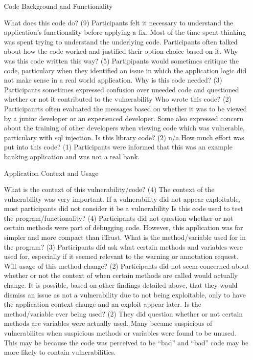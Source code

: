\documentclass[twoside,letterpaper]{soups}
\begin{document}
Code Background and Functionality

What does this code do? (9) Participants felt it necessary to understand the application's functionality before applying a fix. Most of the time spent thinking was spent trying to understand the underlying code. Participants often talked about how the code worked and justified their option choice based on it.
Why was this code written this way? (5) Partipipants would sometimes critique the code, particulary when they identified an issue in which the application logic did not make sense in a real world application.
Why is this code needed? (3) Participants sometimes expressed confusion over uneeded code and questioned whether or not it contributed to the vulnerability
Who wrote this code? (2) Participanrts often evaluated the messages based on whether it was to be viewed by a junior developer or an experienced developer. Some also expressed concern about the training of other developers when viewing code which was vulnerable, particulary with sql injection.
Is this library code? (2) n/a
How much effort was put into this code? (1) Participants were informed that this was an example banking application and was not a real bank. 

Application Context and Usage

What is the context of this vulnerability/code? (4) The context of the vulnerability was very important. If a vulnerability did not appear exploitable, most participants did not consider it be a vulnerability
Is this code used to test the program/functionality? (4) Participants did not question whether or not certain methods were part of debugging code. However, this application was far simpler and more compact than iTrust.
What is the method/variable used for in the program? (3) Participants did ask what certain methods and variables were used for, especially if it seemed relevant to the warning or annotation request.
Will usage of this method change? (2) Participants did not seem concerned about whether or not the context of when certain methods are called would actually change. It is possible, based on other findings detailed above, that they would dismiss an issue as not a vulnerability due to not being exploitable, only to have the application context change and an exploit appear later.
Is the method/variable ever being used? (2) They did question whether or not certain methods are variables were actually used. Many became suspicious of vulnerabilites when suspicious methods or variables were found to be unused. This may be because the code was perceived to be “bad” and “bad” code may be more likely to contain vulnerabilities.
\end{document}
